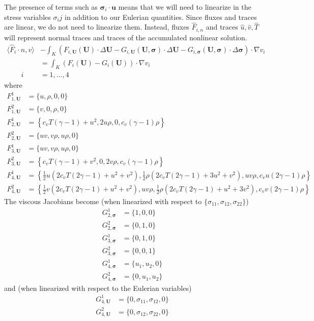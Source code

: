 \documentclass{article}
\newcommand{\grad}{\nabla}
\begin{document}
The presence of terms such as $\boldsymbol \sigma_i \cdot \boldsymbol u$ means that we will need to linearize in the stress variables $\sigma_ij$ in addition to our Eulerian quantities. Since fluxes and traces are linear, we do not need to linearize them. Instead, fluxes $\widehat{F}_{i,n}$ and traces $\widehat{u},\widehat{v},\widehat{T}$ will represent normal traces and traces of the accumulated nonlinear solution. 
\begin{align*}
\langle \widehat{F}_i\cdot n, v\rangle &- \int_K  \left(F_{i,\boldsymbol U}(\boldsymbol U)\cdot \Delta \boldsymbol U -G_{i,\boldsymbol U}(\boldsymbol U, \boldsymbol \sigma)\cdot \Delta \boldsymbol U - G_{i,\boldsymbol \sigma}(\boldsymbol U, \boldsymbol \sigma)\cdot \Delta \boldsymbol \sigma \right)\cdot \grad v_i \\
&= \int_K  \left(F_i(\boldsymbol U)-G_i(\boldsymbol U)\right) \cdot \grad v_i \\
\qquad i &= 1,\ldots, 4
\end{align*}
where
\begin{align*}
F^1_{1,\boldsymbol U} &= \{u,\rho ,0,0\} \\
F^2_{1,\boldsymbol U} &= \{v,0,\rho ,0\} \\
F^1_{2,\boldsymbol U} &=\left\{c_v T (\gamma -1)+u^2,2 u \rho ,0,c_v (\gamma -1) \rho \right\}\\
F^2_{2,\boldsymbol U} &=\{u v,v \rho ,u \rho ,0\}\\
F^1_{3,\boldsymbol U} &=\{u v,v \rho ,u \rho ,0\}\\
F^2_{3,\boldsymbol U} &=\left\{c_v T (\gamma -1)+v^2,0,2 v \rho ,c_v (\gamma -1) \rho \right\}\\
F^1_{4,\boldsymbol U} &=\left\{\frac{1}{2} u \left(2 c_v T (2 \gamma -1)+u^2+v^2\right),\frac{1}{2} \rho  \left(2 c_v T (2 \gamma -1)+3 u^2+v^2\right),u v \rho ,c_v u (2 \gamma -1) \rho \right\}\\
F^2_{4,\boldsymbol U} &=\left\{\frac{1}{2} v \left(2 c_v T (2 \gamma -1)+u^2+v^2\right),u v \rho ,\frac{1}{2} \rho  \left(2c_v T (2 \gamma -1)+u^2+3 v^2\right),c_v v (2 \gamma -1) \rho \right\}
\end{align*}
The viscous Jacobians become (when linearized with respect to $\{\sigma_{11},\sigma_{12}, \sigma_{22}\}$)
\begin{align*}
G^1_{2,\boldsymbol \sigma} &= \{1,0,0\}\\
G^2_{2,\boldsymbol \sigma} &= \{0,1,0\}\\
G^1_{3,\boldsymbol \sigma} &= \{0,1,0\}\\
G^2_{3,\boldsymbol \sigma} &= \{0,0,1\}\\
G^1_{4,\boldsymbol \sigma} &= \{u_1,u_2,0\}\\
G^2_{4,\boldsymbol \sigma} &= \{0,u_1,u_2\}
\end{align*}
and (when linearized with respect to the Eulerian variables)
\begin{align*}
G^1_{4,\boldsymbol U} &= \{0,\sigma_{11},\sigma_{12},0\}\\
G^2_{4,\boldsymbol U} &= \{0,\sigma_{12},\sigma_{22},0\}
\end{align*}
\end{document}
